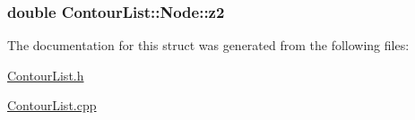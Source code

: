 \subsubsection[{z2}]{\setlength{\rightskip}{0pt plus 5cm}double Contour\+List\+::\+Node\+::z2}\label{structContourList_1_1Node_a5274d7d4c01c5205fb6dec2dd0065e11}


The documentation for this struct was generated from the following files\+:\begin{DoxyCompactItemize}
\item 
\hyperlink{ContourList_8h}{Contour\+List.\+h}\item 
\hyperlink{ContourList_8cpp}{Contour\+List.\+cpp}\end{DoxyCompactItemize}
